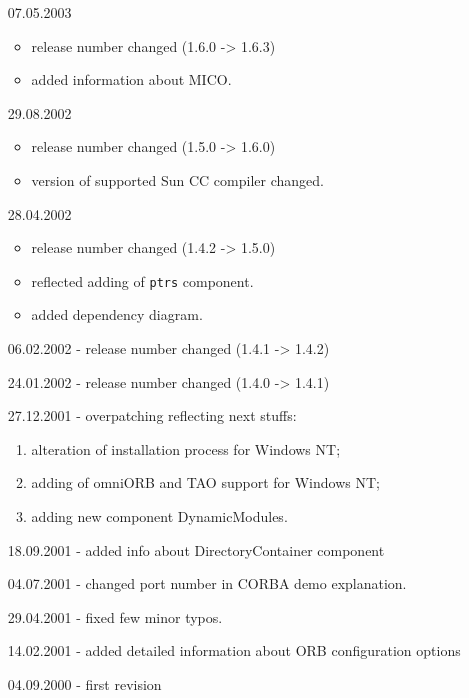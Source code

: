\documentclass[10pt]{article}
\begin{document}
\begin{itemize}
  \item[07.05.2003] 
                   \begin{itemize}
                     \item release number changed (1.6.0 -> 1.6.3)
                     \item added information about MICO.
                   \end{itemize}
  \item[29.08.2002] 
                   \begin{itemize}
                     \item release number changed (1.5.0 -> 1.6.0)
                     \item version of supported Sun CC compiler changed.
                   \end{itemize}
  \item[28.04.2002] 
                   \begin{itemize}
                     \item release number changed (1.4.2 -> 1.5.0)
                     \item reflected adding of \verb|ptrs| component.
                     \item added dependency diagram.
                   \end{itemize}
  \item[06.02.2002] - release number changed (1.4.1 -> 1.4.2)
  \item[24.01.2002] - release number changed (1.4.0 -> 1.4.1)
  \item[27.12.2001] - overpatching reflecting next stuffs: 
                      \begin{enumerate}
                      \item alteration of installation process for Windows NT;
                      \item adding of omniORB and TAO support for Windows NT;
                      \item adding new component DynamicModules.
                      \end{enumerate}
 \item[18.09.2001] - added info about DirectoryContainer component
 \item[04.07.2001] - changed port number in CORBA demo explanation.
 \item[29.04.2001] - fixed few minor typos.
 \item[14.02.2001] - added detailed information about ORB configuration options
 \item[04.09.2000] - first revision
\end{itemize}
\end{document}
